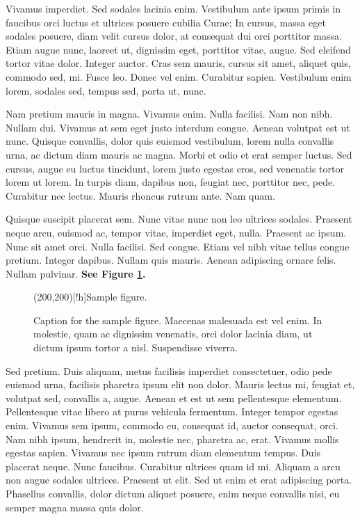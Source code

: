 \documentclass[a4paper,11pt,oneside]{report}
\begin{document}
Vivamus imperdiet. Sed sodales lacinia enim. Vestibulum ante ipsum primis in
faucibus orci luctus et ultrices posuere cubilia Curae; In cursus, massa eget
sodales posuere, diam velit cursus dolor, at consequat dui orci porttitor massa.
Etiam augue nunc, laoreet ut, dignissim eget, porttitor vitae, augue. Sed
eleifend tortor vitae dolor. Integer auctor. Cras sem mauris, cursus sit amet,
aliquet quis, commodo sed, mi. Fusce leo. Donec vel enim. Curabitur sapien.
Vestibulum enim lorem, sodales sed, tempus sed, porta ut, nunc.

Nam pretium mauris in magna. Vivamus enim. Nulla facilisi. Nam non nibh. Nullam
dui. Vivamus at sem eget justo interdum congue. Aenean volutpat est ut nunc.
Quisque convallis, dolor quis euismod vestibulum, lorem nulla convallis urna, ac
dictum diam mauris ac magna. Morbi et odio et erat semper luctus. Sed cursus,
augue eu luctus tincidunt, lorem justo egestas eros, sed venenatis tortor lorem
ut lorem. In turpis diam, dapibus non, feugiat nec, porttitor nec, pede.
Curabitur nec lectus. Mauris rhoncus rutrum ante. Nam quam.

Quisque suscipit placerat sem. Nunc vitae nunc non leo ultrices sodales.
Praesent neque arcu, euismod ac, tempor vitae, imperdiet eget, nulla. Praesent
ac ipsum. Nunc sit amet orci. Nulla facilisi. Sed congue. Etiam vel nibh vitae
tellus congue pretium. Integer dapibus. Nullam quis mauris. Aenean adipiscing
ornare felis. Nullam pulvinar. \textbf{See Figure \ref{fig:sample_figure}.}

\begin{figure}
    \centering
    \framebox(200,200)[!h]{Sample figure.}
    \caption{Caption for the sample figure. 
                Maecenas malesuada est vel enim. In molestie, quam ac dignissim
                venenatis, orci dolor lacinia diam, ut dictum ipsum tortor a
                nisl. Suspendisse viverra.}
    \label{fig:sample_figure}
\end{figure}

Sed pretium. Duis aliquam, metus facilisis imperdiet consectetuer, odio pede
euismod urna, facilisis pharetra ipsum elit non dolor. Mauris lectus mi, feugiat
et, volutpat sed, convallis a, augue. Aenean et est ut sem pellentesque
elementum. Pellentesque vitae libero at purus vehicula fermentum. Integer tempor
egestas enim. Vivamus sem ipsum, commodo eu, consequat id, auctor consequat,
orci. Nam nibh ipsum, hendrerit in, molestie nec, pharetra ac, erat. Vivamus
mollis egestas sapien. Vivamus nec ipsum rutrum diam elementum tempus. Duis
placerat neque. Nunc faucibus. Curabitur ultrices quam id mi. Aliquam a arcu non
augue sodales ultrices. Praesent ut elit. Sed ut enim et erat adipiscing porta.
Phasellus convallis, dolor dictum aliquet posuere, enim neque convallis nisi, eu
semper magna massa quis dolor.
\end{document}
